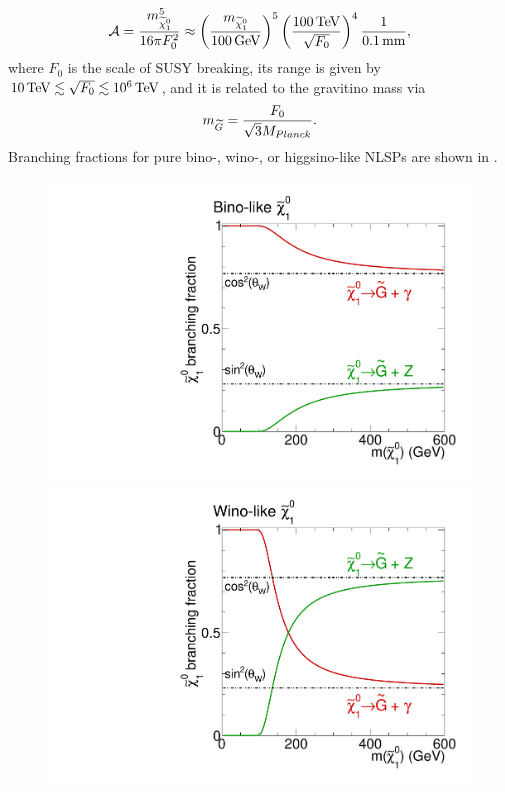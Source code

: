 \begin{equation}
 \mathcal{A} = \frac{m_{\widetilde{\chi}^{0}_{1}}^5}{16\pi F_{0}^{2}}\approx\left(\frac{m_{\widetilde{\chi}^{0}_{1}}}{100\,\text{Ge\hspace{-.08em}V}}\right)^5\left(\frac{100\,\text{Te\hspace{-.08em}V}}{\sqrt{F_0}}\right)^4 \frac{1}{0.1\,\text{mm}},
\end{equation}
where $F_0$ is the scale of SUSY breaking, its  range is given by $10\,\text{Te\hspace{-.08em}V}\lesssim\sqrt{F_0}\lesssim10^6\,\text{Te\hspace{-.08em}V}$, and it is related to the gravitino mass via
\begin{equation}
 m_{\widetilde{G}}=\frac{F_0}{\sqrt{3}M_{Planck}}.
\end{equation}
Branching fractions for pure bino-, wino-, or higgsino-like NLSPs are shown in .
\begin{figure}[htb]
 \centering
 \includegraphics[width=\pairwidth]{figures/signal/binoBranching}
 \includegraphics[width=\pairwidth]{figures/signal/winoBranching}\\

\end{figure}
